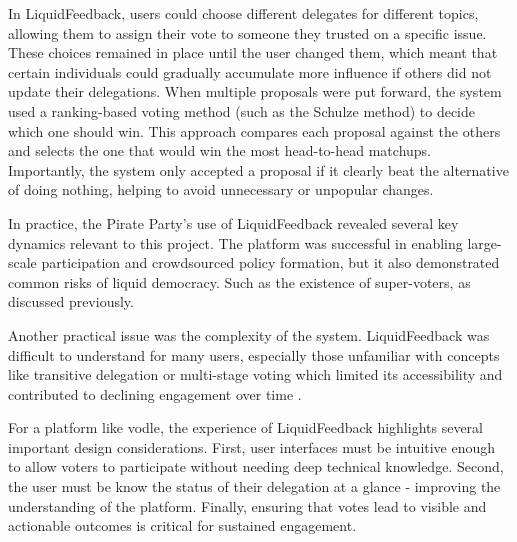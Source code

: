 In LiquidFeedback, users could choose different delegates for different topics, allowing them to assign their vote to someone they trusted on a specific issue. These choices remained in place until the user changed them, which meant that certain individuals could gradually accumulate more influence if others did not update their delegations. When multiple proposals were put forward, the system used a ranking-based voting method (such as the Schulze method) to decide which one should win. This approach compares each proposal against the others and selects the one that would win the most head-to-head matchups. Importantly, the system only accepted a proposal if it clearly beat the alternative of doing nothing, helping to avoid unnecessary or unpopular changes.

In practice, the Pirate Party's use of LiquidFeedback revealed several key dynamics relevant to this project. The platform was successful in enabling large-scale participation and crowdsourced policy formation, but it also demonstrated common risks of liquid democracy. Such as the existence of super-voters, as discussed previously.

Another practical issue was the complexity of the system. LiquidFeedback was difficult to understand for many users, especially those unfamiliar with concepts like transitive delegation or multi-stage voting which limited its accessibility and contributed to declining engagement over time \citep{kling2015votingbehaviourpoweronline}.

For a platform like vodle, the experience of LiquidFeedback highlights several important design considerations. First, user interfaces must be intuitive enough to allow voters to participate without needing deep technical knowledge. Second, the user must be know the status of their delegation at a glance - improving the understanding of the platform. Finally, ensuring that votes lead to visible and actionable outcomes is critical for sustained engagement.


